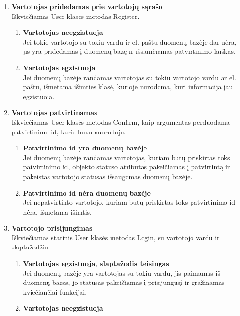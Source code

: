 \documentclass{VUMIFPSkursinis}
\begin{document}
\begin{enumerate}[label=\textbf{T\arabic*}]
\begin{enumerate}[label*=\textbf{.\arabic*}]
				\end{enumerate}
			\item \textbf{Vartotojas pridedamas prie vartotojų sąrašo}\\
				Iškviečiamas User klasės metodas Register.
				\begin{enumerate}[label*=\textbf{.\arabic*}]
					\item \textbf{Vartotojas neegzistuoja}\\
						Jei tokio vartotojo su tokiu vardu ir el. paštu duomenų bazėje dar nėra,
						jis yra pridedamas į duomenų bazę ir išsiunčiamas patvirtinimo laiškas.
					\item \textbf{Vartotojas egzistuoja}\\
						Jei duomenų bazėje randamas vartotojas su tokiu vartotojo vardu ar
						el. paštu, išmetama išimties klasė, kurioje nurodoma, kuri informacija jau egzistuoja.
				\end{enumerate}
			\item \textbf{Vartotojas patvirtinamas}\\
				Iškviečiamas User klasės metodas Confirm, kaip argumentas perduodama patvirtinimo id, 
				kuris buvo nuorodoje.
				\begin{enumerate}[label*=\textbf{.\arabic*}]
					\item \textbf{Patvirtinimo id yra duomenų bazėje}\\
						Jei duomenų bazėje randamas vartotojas, kuriam butų priskirtas toks patvirtinimo id,
						objekto statuso atributas pakeičiamas į patvirtintą ir pakeistas vartotojo statusas
						išsaugomas duomenų bazėje.
					\item \textbf{Patvirtinimo id nėra duomenų bazėje}\\
						Jei nepatvirtinto vartotojo, kuriam butų priskirtas toks patvirtinimo id nėra,
						išmetama išimtis.
				\end{enumerate}
			\item \textbf{Vartotojo prisijungimas}\\
				Iškviečiamas statinis User klasės metodas Login, su vartotojo vardu ir slaptažodžiu
				\begin{enumerate}[label*=\textbf{.\arabic*}]
					\item \textbf{Vartotojas egzistuoja, slaptažodis teisingas}\\
						Jei duomenų bazėje yra vartotojas su tokiu vardu, 
						jis paimamas iš duomenų bazės, jo statusas pakeičiamas į prisijungūsį ir 
						gražinamas kviečiančiai funkcijai.
					\item \textbf{Vartotojas neegzistuoja}\\

\end{enumerate}
\end{enumerate}
\end{document}
